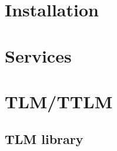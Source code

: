 \documentclass[a4paper,11pt,onecolumn]{mathese}
\begin{document}
\setlength{\parskip}{0.5em}%
\baselineskip 14pt

%


\frontmatter
%
%

\tableofcontents {}
\listoffigures

\mainmatter

\chapter{Installation}
\label{installation}


\chapter{Services}
\label{services}


\chapter{TLM/TTLM}
\label{tlm_ttlm}


\begin{appendix}
\chapter{TLM library}
\label{tlm_appendix}


\end{appendix}

% 
%  


\end{document}
